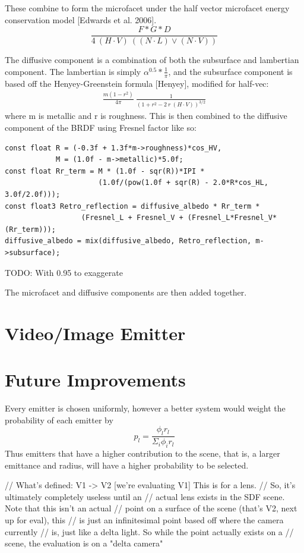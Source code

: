 \message{ !name(test.tex)}\documentclass{article}
\begin{document}
  These combine to form the microfacet under the half vector microfacet energy conservation model [Edwards et al. 2006].
  \[
  	\frac{F*G*D}{4 \: (H \cdot V) \: ( (N \cdot L) \vee (N \cdot V) )}
  \]
  
  The diffusive component is a combination of both the subsurface and lambertian component. The lambertian is simply $\alpha^{0.5} * \frac{1}{\pi}$, and the subsurface component is based off the Henyey-Greenstein formula [Henyey], modified for half-vec:
  \begin{align}
  	\frac{m(1 - r^2)}{4\pi}\:\frac{1}{(1 + r^2 - 2\:r\:
  		(H \cdot V))^{3/2}}
  \end{align}
  where m is metallic and r is roughness. This is then combined to the diffusive component of the BRDF using Fresnel factor like so:
  \begin{lstlisting}
const float R = (-0.3f + 1.3f*m->roughness)*cos_HV,
            M = (1.0f - m->metallic)*5.0f;
const float Rr_term = M * (1.0f - sqr(R))*IPI *
                      (1.0f/(pow(1.0f + sqr(R) - 2.0*R*cos_HL, 3.0f/2.0f)));
const float3 Retro_reflection = diffusive_albedo * Rr_term *
                  (Fresnel_L + Fresnel_V + (Fresnel_L*Fresnel_V*(Rr_term)));
diffusive_albedo = mix(diffusive_albedo, Retro_reflection, m->subsurface);

  \end{lstlisting}
  TODO: With 0.95 to exaggerate
  
  The microfacet and diffusive components are then added together.

  \section{Video/Image Emitter}

  \section{Future Improvements}

  Every emitter is chosen uniformly, however a better system would weight the
  probability of each emitter by
  \[
    p_l = \frac{\phi_lr_l}{\Sigma_i\phi_ir_l}
  \]
  Thus emitters that have a higher contribution to the scene, that is, a larger
  emittance and radius, will have a higher probability to be selected.

 
        // What's defined: V1 -> V2 [we're evaluating V1] This is for a lens.
        // So, it's ultimately completely useless until an
        // actual lens exists in the SDF scene. Note that this isn't an actual
        // point on a surface of the scene (that's V2, next up for eval), this
        // is just an infinitesimal point based off where the camera currently
        // is, just like a delta light. So while the point actually exists on a
        // scene, the evaluation is on a "delta camera"
  
\end{document}
